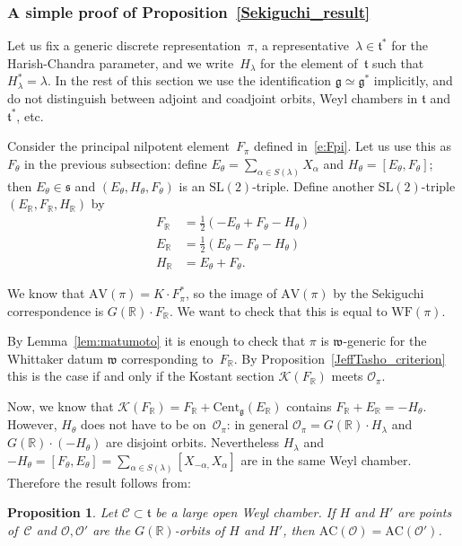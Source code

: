 \documentclass[10pt,leqno]{article}
\newtheorem{proposition}[equation]{Proposition}
\numberwithin{equation}{section}
\newcommand{\R}{\mathbb R}
\renewcommand{\t}{\mathfrak t}
\newcommand{\g}{\mathfrak g}
\newcommand{\s}{\mathfrak s}
\newcommand{\w}{\mathfrak w}
\newcommand{\AV}{\mathrm{AV}}
\newcommand{\WF}{\mathrm{WF}}
\newcommand{\AC}{\mathrm{AC}}
\newcommand{\Kostant}[1]{\mathcal{K}(#1)}
\begin{document}
\subsubsection{A simple proof of Proposition~\ref{Sekiguchi_result}}\label{sec:sekiguchi_proof}

Let us fix a generic discrete representation~$\pi$, a representative~$\lambda \in \t^\ast$ for the Harish-Chandra parameter, and we write~$H_\lambda$ for the element of~$\t$ such that $H_\lambda^\ast=\lambda$. In the rest of this section we use the identification $\g \simeq \g^\ast$ implicitly, and do not distinguish between adjoint and coadjoint orbits, Weyl chambers in $\t$ and $\t^\ast$, etc. 

Consider the principal nilpotent element~$F_\pi$ defined in~\eqref{e:Fpi}. Let us use this as~$F_\theta$ in the previous subsection: define $E_\theta = \sum_{\alpha \in S(\lambda)}X_\alpha$ and $H_\theta  = [E_\theta, F_\theta]$; then $E_\theta \in \s$ and $(E_\theta, H_\theta, F_\theta)$ is an $\mathrm{SL}(2)$-triple. Define another $\mathrm{SL}(2)$-triple $(E_\R, F_\R, H_\R)$ by
\[ \begin{aligned}
  F_\R&=\frac12(-E_\theta+F_\theta-H_\theta)\\
  E_\R&=\frac12(E_\theta-F_\theta-H_\theta)\\
  H_\R&=E_\theta+F_\theta.
\end{aligned}\]
 
We know that  $\AV(\pi)=K \cdot F^*_\pi$, so the image of $\AV(\pi)$ by the Sekiguchi correspondence is 
 $G(\R)\cdot F_\R$. We want to check that this is equal to $\WF(\pi)$. 

By Lemma~\ref{lem:matumoto} it is enough to check that $\pi$ is $\w$-generic for the Whittaker datum $\w$ corresponding to~$F_\R$. By Proposition~\ref{JeffTasho_criterion} this is the case if and only if the Kostant section $\Kostant{F_\R}$ meets $\mathcal{O}_\pi$. 

Now, we know that $\Kostant{F_\R}=F_\R+\mathrm{Cent}_\g(E_\R)$ contains $F_\R+E_\R = -H_\theta$. However, $H_\theta$ does not have to be on~$\mathcal{O}_\pi$: in general $\mathcal{O}_\pi=G(\R) \cdot H_\lambda$ and $G(\R) \cdot (-H_\theta)$ are disjoint orbits. 
Nevertheless $H_{\lambda}$ and $-H_\theta=[F_\theta, E_\theta] = \sum_{\alpha \in S(\lambda)} [X_{-\alpha,} X_\alpha]$ are in the same Weyl chamber.  Therefore the result follows from:  

\begin{proposition}\label{prop:AC_chamber} Let $\mathcal{C} \subset \t$ be a large open Weyl chamber.
If $H$ and $H'$ are  points of~$\mathcal{C}$ and $\mathcal{O}, \mathcal{O}'$ are the   $G(\R)$-orbits of $H$ and $H'$, then $\AC(\mathcal{O})=\AC(\mathcal{O}')$.
\end{proposition}
\end{document}
